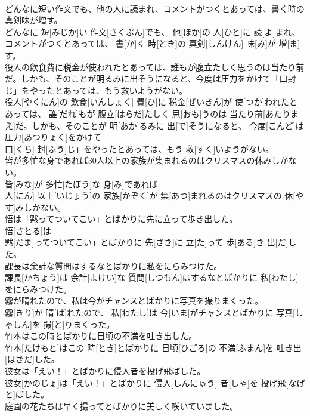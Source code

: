 \documentclass[8pt]{extreport}
\begin{document}
\begin{CJK}{UTF8}{min}
\\	どんなに短い作文でも、他の人に読まれ、コメントがつくとあっては、書く時の真剣味が増す。	
\\	どんなに 短[みじか]い 作文[さくぶん]でも、 他[ほか]の 人[ひと]に 読[よ]まれ、コメントがつくとあっては、 書[か]く 時[とき]の 真剣[しんけん] 味[み]が 増[ま]す。
\\	役人の飲食費に税金が使われたとあっては、誰もが腹立たしく思うのは当たり前だ。しかも、そのことが明るみに出そうになると、今度は圧力をかけて「口封じ」をやったとあっては、もう救いようがない。	
\\	役人[やくにん]の 飲食[いんしょく] 費[ひ]に 税金[ぜいきん]が 使[つか]われたとあっては、 誰[だれ]もが 腹立[はらだ]たしく 思[おも]うのは 当たり前[あたりまえ]だ。しかも、そのことが 明[あか]るみに 出[で]そうになると、 今度[こんど]は 圧力[あつりょく]をかけて
\\	口[くち] 封[ふう]じ」をやったとあっては、もう 救[すく]いようがない。
\\	皆が多忙な身であれば30人以上の家族が集まれるのはクリスマスの休みしかない。	
\\	皆[みな]が 多忙[たぼう]な 身[み]であれば 
\\	人[にん] 以上[いじょう]の 家族[かぞく]が 集[あつ]まれるのはクリスマスの 休[やす]みしかない。
\\	悟は「黙ってついてこい」とばかりに先に立って歩き出した。	
\\	悟[さとる]は
\\	黙[だま]ってついてこい」とばかりに 先[さき]に 立[た]って 歩[ある]き 出[だ]した。
\\	課長は余計な質問はするなとばかりに私をにらみつけた。	
\\	課長[かちょう]は 余計[よけい]な 質問[しつもん]はするなとばかりに 私[わたし]をにらみつけた。
\\	霧が晴れたので、私は今がチャンスとばかりに写真を撮りまくった。	
\\	霧[きり]が 晴[は]れたので、 私[わたし]は 今[いま]がチャンスとばかりに 写真[しゃしん]を 撮[と]りまくった。
\\	竹本はこの時とばかりに日頃の不満を吐き出した。	
\\	竹本[たけもと]はこの 時[とき]とばかりに 日頃[ひごろ]の 不満[ふまん]を 吐き出[はきだ]した。
\\	彼女は「えい！」とばかりに侵入者を投げ飛ばした。	
\\	彼女[かのじょ]は「えい！」とばかりに 侵入[しんにゅう] 者[しゃ]を 投げ飛[なげと]ばした。
\\	庭園の花たちは早く撮ってとばかりに美しく咲いていました。	

\end{CJK}
\end{document}
